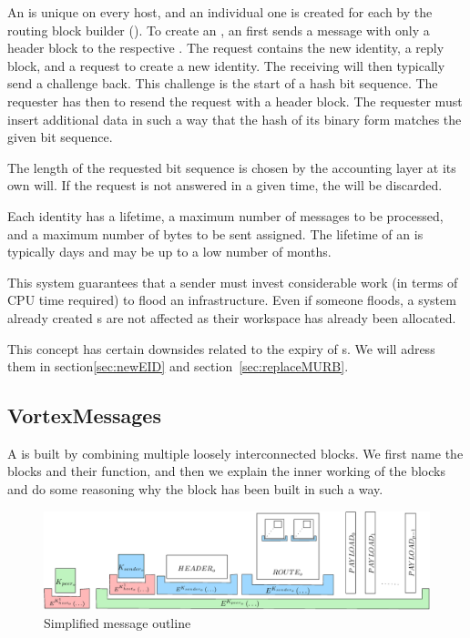 An  is unique on every host, and an individual one is created for each \VortexNode by the routing block builder (). To create an , an  first sends a message with only a header block to the respective \VortexNode. The request contains the new identity, a reply block, and a request to create a new identity. The receiving \VortexNode will then typically send a challenge back. This challenge is the start of a hash bit sequence. The requester has then to resend the request with a header block. The requester must insert additional data in such a way that the hash of its binary form matches the given bit sequence. 

The length of the requested bit sequence is chosen by the accounting layer at its own will. If the request is not answered in a given time, the  will be discarded.

Each identity has a lifetime, a maximum number of messages to be processed, and a maximum number of bytes to be sent assigned. The lifetime of an  is typically days and may be up to a low number of months.

This system guarantees that a sender must invest considerable work (in terms of CPU time required) to flood an infrastructure. Even if someone floods, a system already created s are not affected as their workspace has already been allocated.

This concept has certain downsides related to the expiry of s. We will adress them in section\ref{sec:newEID} and section~\ref{sec:replaceMURB}.

\subsection{VortexMessages}\label{sec:vortexMessage}
A \VortexMessage is built by combining multiple loosely interconnected blocks. We first name the blocks and their function, and then we explain the inner working of the blocks and do some reasoning why the block has been built in such a way. 

\begin{figure}[ht]
	\includegraphics[width=\textwidth]{inc/blockLayoutSimplified}
	\caption{Simplified message outline}
	\label{fig:messageOutline}
\end{figure}

